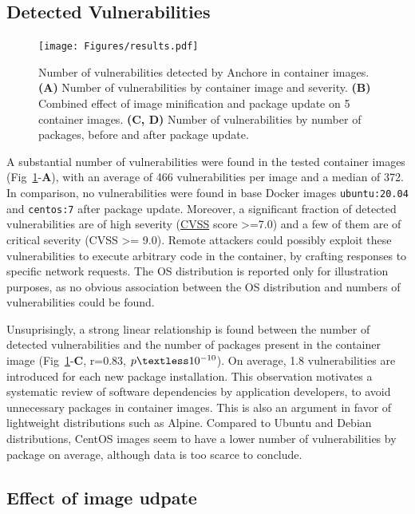 \documentclass[a4paper,num-refs]{oup-contemporary}
\begin{document}
\subsection{Detected Vulnerabilities}


\begin{figure}
\texttt{[image: Figures/results.pdf]}
\caption{\label{fig:vulnerabilities} Number of vulnerabilities detected
by Anchore in container images. \textbf{(A)} Number of vulnerabilities
by container image and severity. \textbf{(B)} Combined
effect of image minification and package update on 5 container images. \textbf{(C, D)}
Number of vulnerabilities by number of packages, before and after
package update.}
\end{figure}

A substantial number of vulnerabilities were found in the tested container
 images (Fig~\ref{fig:vulnerabilities}-\textbf{A}), with an average of 466 vulnerabilities
  per image and a median of 372. In comparison, no vulnerabilities were found in base
 Docker images \texttt{ubuntu:20.04} and \texttt{centos:7} after package
 update. Moreover, a significant fraction of detected vulnerabilities are
 of high severity
 (\href{https://www.first.org/cvss/specification-document}{CVSS} score
 >=7.0) and a few of them are of critical severity (CVSS >= 9.0). Remote
 attackers could possibly exploit these vulnerabilities to execute
 arbitrary code in the container, by crafting responses to specific network
 requests. The OS distribution is reported only for illustration purposes,
 as no obvious association between the OS distribution and numbers of
 vulnerabilities could be found.

Unsuprisingly, a strong linear relationship is found between the number of
detected vulnerabilities and the number of packages present in the
container image (Fig~\ref{fig:vulnerabilities}-\textbf{C}, r=0.83,
$p\textless10^{-10}$). On average, 1.8 vulnerabilities are introduced for
each new package installation. This observation motivates a systematic
review of software dependencies by application developers, to avoid
unnecessary packages in container images. This is also an argument in favor of lightweight
distributions such as Alpine. Compared to Ubuntu and Debian distributions,
CentOS images seem to have a lower number of vulnerabilities by package on
average, although data is too scarce to conclude.

\subsection{Effect of image udpate}
\end{document}
